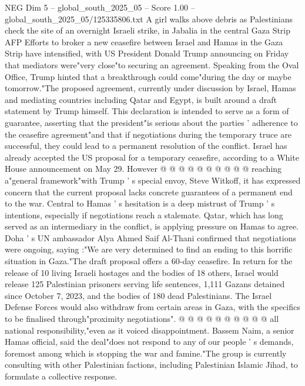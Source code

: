 \begin{textsample}{NEG Dim 5 – global\_south\_2025\_05 – Score 1.00 – global\_south\_2025\_05/125335806.txt}  \label{ex:f5_neg_265}
A girl walks above debris as Palestinians check the site of an overnight Israeli strike, in Jabalia in the central Gaza Strip AFP Efforts to broker a new ceasefire between Israel and Hamas in the Gaza Strip have intensified, with US President Donald Trump announcing on Friday that mediators were"very close"to securing an agreement.
Speaking from the Oval Office, Trump hinted that a breakthrough could come"during the day or maybe tomorrow."The proposed agreement, currently under discussion by Israel, Hamas and mediating countries including Qatar and Egypt, is built around a draft statement by Trump himself.
This declaration is intended to serve as a form of guarantee, asserting that the president"is serious about the parties ' adherence to the ceasefire agreement"and that if negotiations during the temporary truce are successful, they could lead to a permanent resolution of the conflict.
Israel has already accepted the US proposal for a temporary ceasefire, according to a White House announcement on May 29.
However @ @ @ @ @ @ @ @ @ @ reaching a"general framework"with Trump ' s special envoy, Steve Witkoff, it has expressed concern that the current proposal lacks concrete guarantees of a permanent end to the war.
Central to Hamas ' s hesitation is a deep mistrust of Trump ' s intentions, especially if negotiations reach a stalemate.
Qatar, which has long served as an intermediary in the conflict, is applying pressure on Hamas to agree.
Doha ' s UN ambassador Alya Ahmed Saif Al-Thani confirmed that negotiations were ongoing, saying :"We are very determined to find an ending to this horrific situation in Gaza."The draft proposal offers a 60-day ceasefire.
In return for the release of 10 living Israeli hostages and the bodies of 18 others, Israel would release 125 Palestinian prisoners serving life sentences, 1,111 Gazans detained since October 7, 2023, and the bodies of 180 dead Palestinians.
The Israel Defense Forces would also withdraw from certain areas in Gaza, with the specifics to be finalised through"proximity negotiations". @ @ @ @ @ @ @ @ @ @ all national responsibility,"even as it voiced disappointment.
Bassem Naim, a senior Hamas official, said the deal"does not respond to any of our people ' s demands, foremost among which is stopping the war and famine."The group is currently consulting with other Palestinian factions, including Palestinian Islamic Jihad, to formulate a collective response.

\end{textsample}
